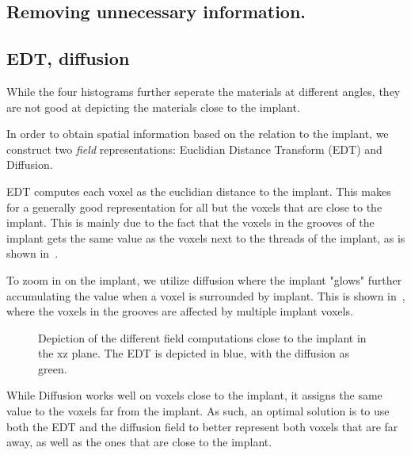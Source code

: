 \subsection{Removing unnecessary information.}

\subsection{EDT, diffusion}
While the four histograms further seperate the materials at different angles, they are not good at depicting the materials close to the implant.

In order to obtain spatial information based on the relation to the implant, we construct two \emph{field} representations: Euclidian Distance Transform (EDT) and Diffusion.

EDT computes each voxel as the euclidian distance to the implant. This makes for a generally good representation for all but the voxels that are close to the implant. This is mainly due to the fact that the voxels in the grooves of the implant gets the same value as the voxels next to the threads of the implant, as is shown in~.

To zoom in on the implant, we utilize diffusion where the implant "glows" further accumulating the value when a voxel is surrounded by implant. This is shown in~, where the voxels in the grooves are affected by multiple implant voxels.

\begin{figure}
    \centering
    \caption{Depiction of the different field computations close to the implant in the xz plane. The EDT is depicted in blue, with the diffusion as green.}
    \label{fig:edt-vs-diffusion}
\end{figure}

While Diffusion works well on voxels close to the implant, it assigns the same value to the voxels far from the implant. As such, an optimal solution is to use both the EDT and the diffusion field to better represent both voxels that are far away, as well as the ones that are close to the implant.

